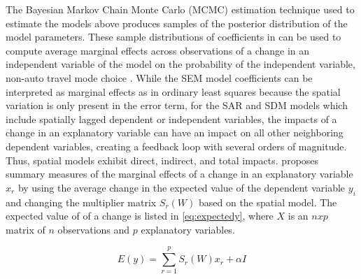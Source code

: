 The Bayesian Markov Chain Monte Carlo (MCMC) estimation technique used to estimate the models above produces samples of the posterior distribution of the model parameters.  These sample distributions of coefficients in can be used to compute average marginal  effects across observations of a change in an independent variable of the model on the probability  of the independent variable, non-auto travel mode choice \citep{LeSage2009}.  While the SEM model coefficients can be interpreted as marginal effects as in ordinary least squares because the spatial variation is only present in the error term, for the SAR and SDM models which include spatially lagged dependent or independent variables, the impacts of a change in an explanatory variable can have an impact on all other neighboring dependent variables, creating a feedback loop with several orders of magnitude.  Thus, spatial models exhibit direct, indirect, and total impacts.  \cite{LeSage2009} proposes summary measures of the marginal effects of a change in an explanatory variable $x_r$ by using the average change in the expected value of the dependent variable $y_i$ and changing the multiplier matrix $S_r(W)$ based on the spatial model.  The expected value of of a change is listed in \autoref{eq:expectedy}, where $X$ is an $n x p$ matrix of $n$ observations and $p$ explanatory variables.

\begin{equation}
\label{eq:expectedy}
E(y) = \sum_{r=1}^{p} S_r(W) x_r + \alpha I
\end{equation}

